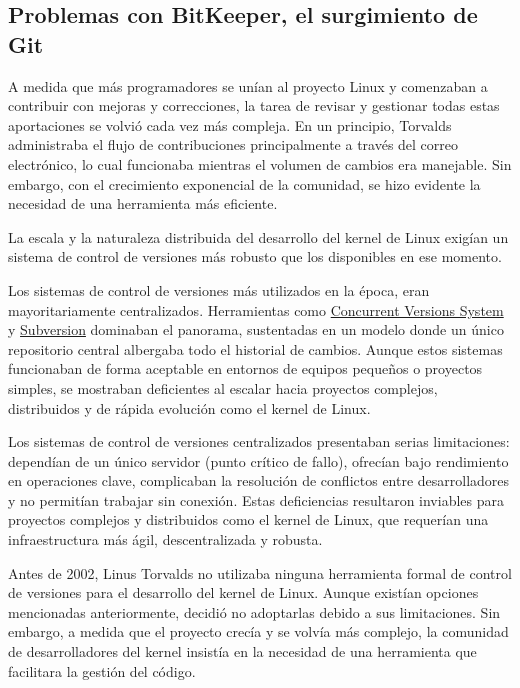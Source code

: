\documentclass[a4paper,12pt]{article}
\begin{document}
\subsection{Problemas con BitKeeper, el surgimiento de Git}

A medida que más programadores se unían al proyecto Linux y comenzaban a
contribuir con mejoras y correcciones, la tarea de revisar y gestionar todas
estas aportaciones se volvió cada vez más compleja. En un principio,
Torvalds administraba el flujo de contribuciones principalmente a través del
correo electrónico, lo cual funcionaba mientras el volumen de cambios era
manejable. Sin embargo, con el crecimiento exponencial de la comunidad, se hizo
evidente la necesidad de una herramienta más eficiente.

La escala y la naturaleza distribuida del desarrollo del kernel de Linux exigían
un sistema de control de versiones más robusto que los disponibles en ese
momento.

Los sistemas de control de versiones más utilizados en la época, eran
mayoritariamente centralizados. Herramientas como \hyperlink{concurrent versions
system }{Concurrent Versions System } y \hyperlink{svn}{Subversion} dominaban el
panorama, sustentadas en un modelo donde un único repositorio central albergaba
todo el historial de cambios.  Aunque estos sistemas funcionaban de forma
aceptable en entornos de equipos pequeños o proyectos simples, se mostraban
deficientes al escalar hacia proyectos complejos, distribuidos y de rápida
evolución como el kernel de Linux.

Los sistemas de control de versiones centralizados presentaban serias
limitaciones: dependían de un único servidor (punto crítico de fallo), ofrecían
bajo rendimiento en operaciones clave, complicaban la resolución de conflictos
entre desarrolladores y no permitían trabajar sin conexión. Estas deficiencias
resultaron inviables para proyectos complejos y distribuidos como el kernel de
Linux, que requerían una infraestructura más ágil, descentralizada y robusta.

Antes de 2002, Linus Torvalds no utilizaba ninguna herramienta formal de control
de versiones para el desarrollo del kernel de Linux. Aunque existían
opciones mencionadas anteriormente, decidió no adoptarlas debido a sus
limitaciones.  Sin embargo, a medida que el proyecto crecía y se volvía más
complejo, la comunidad de desarrolladores del kernel insistía en la necesidad de
una herramienta que facilitara la gestión del código.
\end{document}
